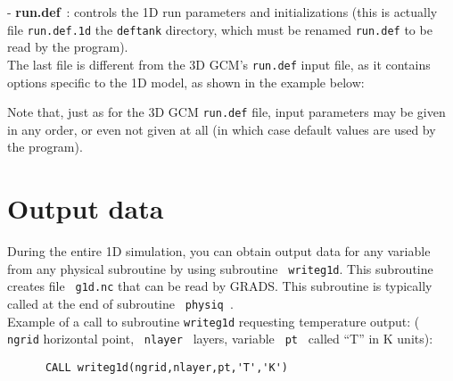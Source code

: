 - {\bf run.def}~: controls the 1D run parameters and initializations
(this is actually file {\tt run.def.1d} the {\tt deftank} directory,
which must be renamed {\tt run.def} to be read by the program).\\

The last file is different from the 3D GCM's {\tt run.def} input file,
as it contains options specific to the 1D model, as shown in the example
below:

Note that, just as for the 3D GCM {\tt run.def} file, input
parameters may be given in any order, or even not given at all
(in which case default values are used by the program).


\section{Output data}

During the entire 1D simulation, you can obtain output data for any
variable from any physical subroutine by using subroutine \verb+ writeg1d+.
This subroutine creates file \verb+ g1d.nc+ that can be read by GRADS.
This subroutine is typically called at the end of subroutine
\verb+ physiq +. \\

Example of a call to subroutine {\tt writeg1d} requesting
temperature output:
(\verb+ ngrid+ horizontal point, \verb+ nlayer + layers, variable
\verb+ pt + called ``T'' in K units):

\begin{verbatim}
      CALL writeg1d(ngrid,nlayer,pt,'T','K')
\end{verbatim}


